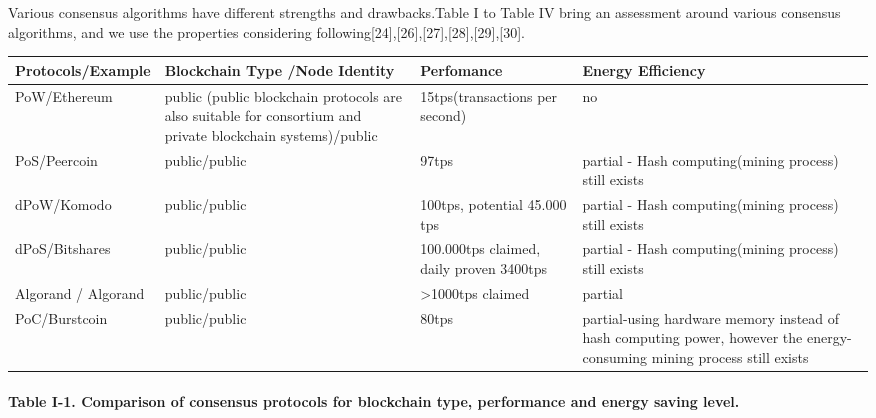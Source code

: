 \documentclass[doublespacing]{bmcart}
\begin{document}
\begin{CJK*}{UTF8}{gbsn}
Various consensus algorithms have different strengths and drawbacks.Table I to Table IV bring an assessment around various consensus algorithms, and we use the properties considering following[24],[26],[27],[28],[29],[30]. \newline
\begin{tabular}{p{2cm}p{3cm}p{3cm}p{3cm}}
\hline
Protocols/E\-xample & Blockchain Type \newline /Node Identity & Perfo\-mance & Energy Efficiency \\ \hline
PoW/Ethereum  & public \newline(public blockchain protocols are also suitable for consortium and private blockchain systems)/public  & 15tps(trans\-actions per second) & no \\ \hline
PoS/Peercoin & public/public & 97tps & partial - Hash computing(mining process) still exists \\ \hline
dPoW/Komodo & public/public & 100tps, potential 45.000 tps & partial - Hash computing(mining process) still exists \\ \hline
dPoS/\newline Bitshares & public/public & 100.000tps claimed, daily proven 3400tps & partial - Hash computing(mining process) still exists \\ \hline
Algorand / Algorand & public/public & \textgreater1000tps claimed & partial  \\ \hline
PoC/Burstcoin & public/public & 80tps & partial-using hardware memory instead of hash computing power, however the energy-consuming mining process still exists \\ \hline
\end{tabular}
\paragraph{Table I-1. Comparison of consensus protocols for blockchain type, performance and energy saving level.}



\end{CJK*}
\end{document}
